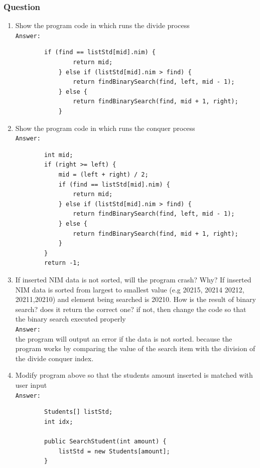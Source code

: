 \documentclass[12pt,titlepage]{article}
\begin{document}
\subsubsection{Question}

\begin{enumerate}
    \item Show the program code in which runs the divide process
    \mbox{}\\
    \texttt{Answer: }
    \begin{verbatim}
        if (find == listStd[mid].nim) {
                return mid;
            } else if (listStd[mid].nim > find) {
                return findBinarySearch(find, left, mid - 1);
            } else {
                return findBinarySearch(find, mid + 1, right);
            }
    \end{verbatim}
    \item Show the program code in which runs the conquer process
    \mbox{}\\
    \texttt{Answer: }
    \begin{verbatim}
        int mid;
        if (right >= left) {
            mid = (left + right) / 2;
            if (find == listStd[mid].nim) {
                return mid;
            } else if (listStd[mid].nim > find) {
                return findBinarySearch(find, left, mid - 1);
            } else {
                return findBinarySearch(find, mid + 1, right);
            }
        }
        return -1;
    \end{verbatim}
    \item If inserted NIM data is not sorted, will the program crash? Why? If inserted NIM data is sorted from largest to smallest value (e.g 20215, 20214 20212, 20211,20210) and element being searched is 20210. How is the result of binary search? does it return the correct one? if not, then change the code so that the binary search executed properly
    \mbox{}\\
    \texttt{Answer: }
    \mbox{}\\
    the program will output an error if the data is not sorted. because the program works by comparing the value of the search item with the division of the divide conquer index.
    \item Modify program above so that the students amount inserted is matched with user input
    \mbox{}\\
    \texttt{Answer: }
    \mbox{}\\
    \begin{verbatim}
        Students[] listStd;
        int idx;

        public SearchStudent(int amount) {
            listStd = new Students[amount];
        }
    \end{verbatim}
\end{enumerate}
\end{document}
